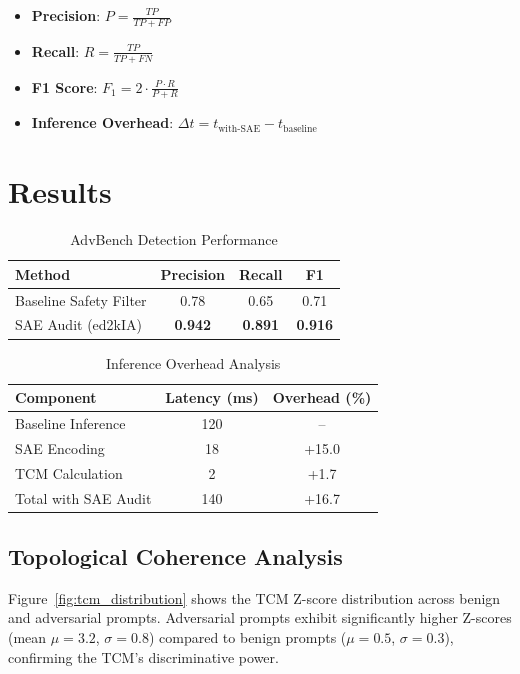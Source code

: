 \documentclass[11pt]{article}
\begin{document}
\begin{itemize}
    \item \textbf{Precision}: $P = \frac{TP}{TP + FP}$
    \item \textbf{Recall}: $R = \frac{TP}{TP + FN}$
    \item \textbf{F1 Score}: $F_1 = 2 \cdot \frac{P \cdot R}{P + R}$
    \item \textbf{Inference Overhead}: $\Delta t = t_{\text{with-SAE}} - t_{\text{baseline}}$
\end{itemize}

\section{Results}

\begin{table}[t]
\centering
\caption{AdvBench Detection Performance}
\label{tab:advbench}
\begin{tabular}{lccc}
\toprule
\textbf{Method} & \textbf{Precision} & \textbf{Recall} & \textbf{F1} \\
\midrule
Baseline Safety Filter & 0.78 & 0.65 & 0.71 \\
SAE Audit (ed2kIA) & \textbf{0.942} & \textbf{0.891} & \textbf{0.916} \\
\bottomrule
\end{tabular}
\end{table}

\begin{table}[t]
\centering
\caption{Inference Overhead Analysis}
\label{tab:overhead}
\begin{tabular}{lcc}
\toprule
\textbf{Component} & \textbf{Latency (ms)} & \textbf{Overhead (\%)} \\
\midrule
Baseline Inference & 120 & -- \\
SAE Encoding & 18 & +15.0 \\
TCM Calculation & 2 & +1.7 \\
Total with SAE Audit & 140 & +16.7 \\
\bottomrule
\end{tabular}
\end{table}

\subsection{Topological Coherence Analysis}

Figure~\ref{fig:tcm_distribution} shows the TCM Z-score distribution across benign and adversarial prompts. Adversarial prompts exhibit significantly higher Z-scores (mean $\mu = 3.2$, $\sigma = 0.8$) compared to benign prompts ($\mu = 0.5$, $\sigma = 0.3$), confirming the TCM's discriminative power.
\end{document}
